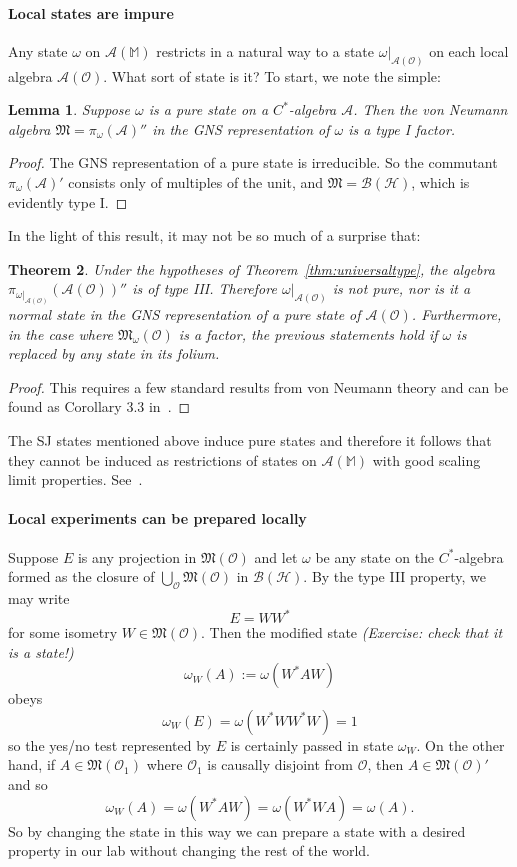 \documentclass[12pt]{article}
\newcommand{\1}{\mathds{1}}                         %
\newcommand{\Ocal}{\mathcal{O}}
\newcommand{\MM}{\mathbb{M}}
\newcommand{\BB}{{\mathcal{B}}}
\newcommand{\HH}{{\mathcal{H}}}
\newcommand{\Mf}{{\mathfrak{M}}}
\newcommand{\Ac}{{\mathcal{A}}}
\newtheorem{theorem}{Theorem}%
\newtheorem{lemma}[theorem]{Lemma}
\begin{document}
\paragraph{Local states are impure} Any state $\omega$ on $\Ac(\MM)$ restricts in a natural way to a state $\omega|_{\Ac(\Ocal)}$ on each local algebra $\Ac(\Ocal)$. 
What sort of state is it? To start, we note the simple:
\begin{lemma}
	Suppose $\omega$ is a pure state on a $C^*$-algebra $\Ac$. Then the von Neumann algebra $\Mf=\pi_\omega(\Ac)''$ in the GNS representation of $\omega$ is a type I factor. 
\end{lemma}
\begin{proof}
The GNS representation of a pure state is irreducible. So the commutant $\pi_\omega(\Ac)'$ consists only of multiples of the unit, and $\Mf=\BB(\HH)$,
which is evidently type I.
\end{proof}
In the light of this result, it may not be so much of a surprise that:
\begin{theorem}
	Under the hypotheses of Theorem~\ref{thm:universaltype}, the algebra
	$\pi_{\omega|_{\Ac(\Ocal)}}(\Ac(\Ocal))''$ is of type III. Therefore $\omega|_{\Ac(\Ocal)}$ is not pure, nor is it a normal state in the GNS representation of a pure state of $\Ac(\Ocal)$. 
	Furthermore, in the case where $\Mf_\omega(\Ocal)$ is a factor, the previous statements
	hold if $\omega$ is replaced by any state in its folium. 
\end{theorem}
\begin{proof} This requires a few standard results from von Neumann theory and can be found as Corollary 3.3 in~\cite{FewsterVerch:2013}.
\end{proof}
The SJ states mentioned above induce pure states and therefore it follows that they cannot be induced as restrictions of states on $\Ac(\MM)$ with good scaling limit properties. See~\cite{FewsterVerch:2013}. 

\paragraph{Local experiments can be prepared locally} 
Suppose $E$ is any projection in $\Mf(\Ocal)$ and let $\omega$ be any state
on the $C^*$-algebra formed as the closure of $\bigcup_{\Ocal}\Mf(\Ocal)$ in $\BB(\HH)$. By the type III property, we may write
\[
E= WW^*
\]
for some isometry $W\in\Mf(\Ocal)$. Then the modified state \emph{(Exercise: check that it is a state!)}
\[
\omega_W(A):= \omega(W^* A W)
\]
obeys
\[
\omega_W(E) = \omega(W^*WW^*W) =1
\]
so the yes/no test represented by $E$ is certainly passed in state $\omega_W$.
On the other hand, if $A\in\Mf(\Ocal_1)$ where $\Ocal_1$ is causally disjoint from $\Ocal$, then 
$A\in\Mf(\Ocal)'$ and so
\[
\omega_W(A) = \omega(W^*AW) = \omega(W^*WA) = \omega(A).
\]
So by changing the state in this way we can prepare a state with a desired property in our lab without changing the rest of the world.
\end{document}

